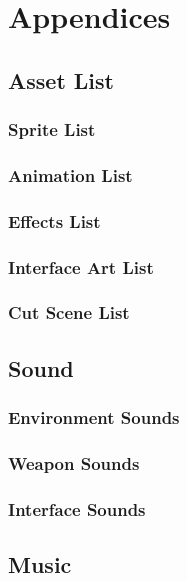 
\section{Appendices}

\subsection{Asset List}

\subsubsection{Sprite List}

\subsubsection{Animation List}

\subsubsection{Effects List}

\subsubsection{Interface Art List}

\subsubsection{Cut Scene List}

\subsection{Sound}

\subsubsection{Environment Sounds}

\subsubsection{Weapon Sounds}

\subsubsection{Interface Sounds}

\subsection{Music}

